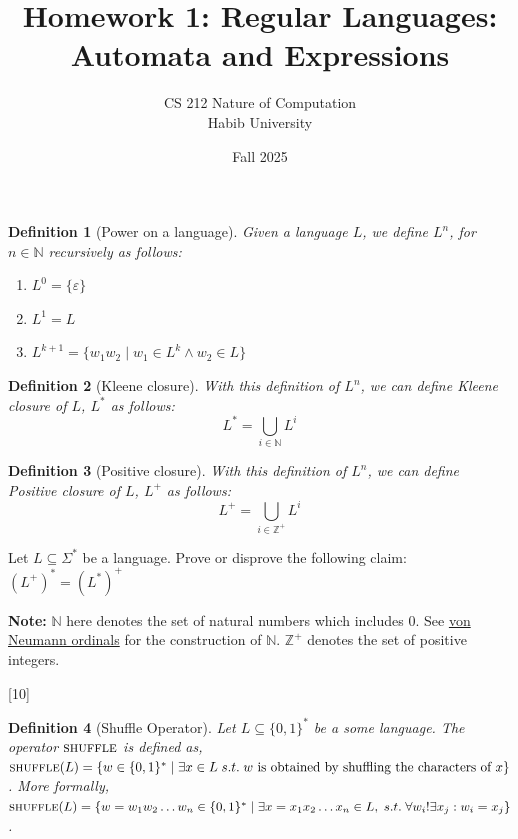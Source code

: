 \documentclass[a4paper]{exam}
\title{Homework 1: Regular Languages: Automata and Expressions}
\author{CS 212 Nature of Computation\\Habib University\\
}
\date{Fall 2025}
\newcommand{\shuffle}{\textsc{shuffle}} %
\newtheorem{definition}{Definition}
\begin{document}
\maketitle


\begin{questions}
    \question[10]
    \begin{definition}[Power on a language]
        Given a language $L$, we define $L^n$, for $n \in \mathbb{N}$ recursively as follows:
        \begin{enumerate}
            \item $L^0 = \{\varepsilon\}$ 
            \item $L^1 = L$
            \item $L^{k+1} = \{w_1w_2\mid w_1 \in L^k \land w_2 \in L\}$
        \end{enumerate}
    \end{definition}
    \begin{definition}[Kleene closure]
        With this definition of $L^n$, we can define Kleene closure of $L$, $L^*$ as follows:
        $$L^*=\bigcup_{i \in \mathbb{N}} L^i$$
    \end{definition}
    \begin{definition}[Positive closure]
        With this definition of $L^n$, we can define Positive closure of $L$, $L^+$ as follows:
        $$L^+=\bigcup_{i \in \mathbb{Z}^+} L^i$$
    \end{definition}
    
    Let $L \subseteq \Sigma^*$ be a language. Prove or disprove the following claim:
    $(L^+)^*=(L^*)^+$
    
    \begin{solution}
    \end{solution}
    
    \textbf{Note:} $\mathbb{N}$ here denotes the set of natural numbers which includes 0. See \href{https://en.wikipedia.org/wiki/Set-theoretic_definition_of_natural_numbers}{von Neumann ordinals} for the construction of $\mathbb{N}$.
    $\mathbb{Z}^+$ denotes the set of positive integers.

    [10]

    \begin{definition}[Shuffle Operator]
        Let $L \subseteq \{0,1\}^*$ be a some language. The operator $\shuffle$ is defined as, $\shuffle(L) = \{w\in \{0,1\}^*\mid \exists x \in L \;s.t. \; w \text{ is obtained by shuffling the characters of } x\}$. More formally, $\shuffle(L) = \{w = w_1w_2\dots w_n\in \{0,1\}^*\mid \exists x = x_1x_2 \dots x_n \in L, \;s.t.\; \forall w_i !\exists x_j : w_i = x_j\}$. 
    \end{definition}
    

\end{questions}
\end{document}
